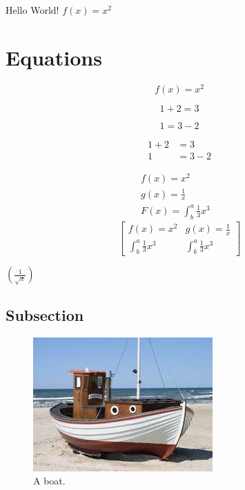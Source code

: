 \documentclass{article}
\begin{document}
Hello World! $f(x) = x^2$

\section{Equations}

\begin{equation}
    f(x) = x^2
  \end{equation}
  
  \begin{equation*}
    1 + 2 = 3 
  \end{equation*}
  
  \begin{equation*}
    1 = 3 - 2
  \end{equation*}
  
  \begin{align*}
    1 + 2 &= 3\\
    1 &= 3 - 2
  \end{align*}

  \begin{align*}
    f(x) = x^2&\\
    g(x) = \frac{1}{x}&\\
    F(x) = \int^a_b \frac{1}{3}x^3&
  \end{align*}
  \begin{equation}
  \left[
    \begin{matrix}
      f(x) = x^2 & g(x) = \frac{1}{x}\\
      \int^a_b \frac{1}{3}x^3 & \int^a_b \frac{1}{3}x^3
    \end{matrix}
    \right]
  \end{equation}

  $\left(\frac{1}{\sqrt{x}}\right)$

\newpage
\subsection{Subsection}

\begin{figure}
  \includegraphics[width=\linewidth]{boat.jpg}
  \caption{A boat.}
  \label{fig:boat1}
\end{figure}
\end{document}
